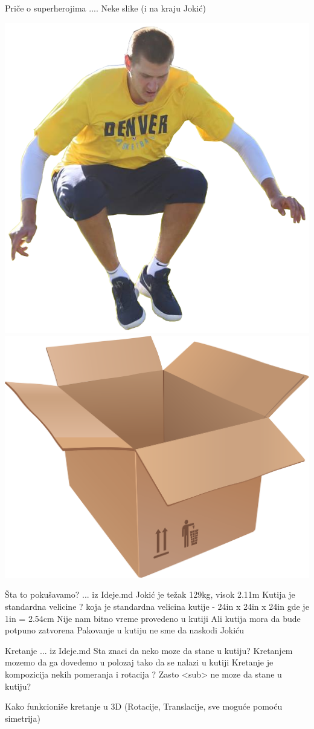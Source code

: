 \documentclass{beamer}
\begin{document}
    \begin{frame}{Priče o superherojima}
        .... Neke slike (i na kraju Jokić)
    \end{frame}
    \begin{frame}{}
        \includegraphics[height=0.4\textwidth]{Res/Jokic/Jokic_skok} \\
        \includegraphics[height=0.4\textwidth]{Res/box}
    \end{frame}
    \begin{frame}{Šta to pokušavamo?}
        ... iz Ideje.md
        Jokić je težak 129kg, visok 2.11m
        Kutija je standardna velicine
          ? koja je standardna velicina kutije
          - 24in x 24in x 24in gde je 1in = 2.54cm
        Nije nam bitno vreme provedeno u kutiji
        Ali kutija mora da bude potpuno zatvorena
        Pakovanje u kutiju ne sme da naskodi Jokiću
    \end{frame}
    \begin{frame}{Kretanje}
        ... iz Ideje.md
        Sta znaci da neko moze da stane u kutiju?
        Kretanjem mozemo da ga dovedemo u polozaj
        tako da se nalazi u kutiji
        Kretanje je kompozicija nekih pomeranja i rotacija
        ? Zasto <sub> ne moze da stane u kutiju?

        Kako funkcioniše kretanje u 3D
        (Rotacije, Translacije, sve moguće pomoću simetrija)
    \end{frame}
\end{document}
